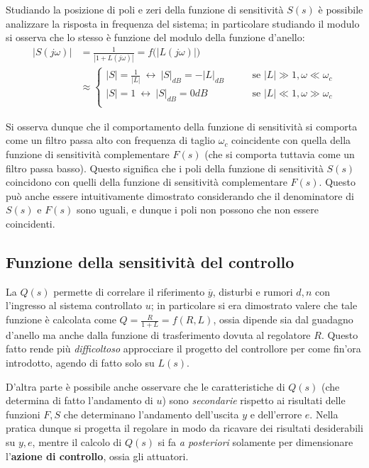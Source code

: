 		Studiando la posizione di poli e zeri della funzione di sensitività $S(s)$ è possibile analizzare la risposta in frequenza del sistema; in particolare studiando il modulo  si osserva che lo stesso è funzione del modulo della funzione d'anello:
		\begin{align*}
			|S(j\omega)| & = \frac 1 {|1 + L(j\omega)|} = f\big(|L(j\omega)|\big) \\
			& \approx \begin{cases}
				|S| = \frac 1 {|L|} \ \leftrightarrow \ |S|_{dB} = - |L|_{dB} \qquad & \textrm{se } |L|\gg 1, \omega \ll \omega_c \\
				|S| = 1 \ \leftrightarrow \ |S|_{dB} = 0dB \qquad & \textrm{se } |L|\ll 1, \omega \gg \omega_c \\
			\end{cases}
		\end{align*}
		
		Si osserva dunque che il comportamento della funzione di sensitività si comporta come un filtro passa alto con frequenza di taglio $\omega_c$ coincidente con quella della funzione di sensitività complementare $F(s)$ (che si comporta tuttavia come un filtro passa basso). Questo significa che i poli della funzione di sensitività $S(s)$ coincidono con quelli della funzione di sensitività complementare $F(s)$. Questo può anche essere intuitivamente dimostrato considerando che il denominatore di $S(s)$ e $F(s)$ sono uguali, e dunque i poli non possono che non essere coincidenti.
		
	\subsection{Funzione della sensitività del controllo}
		La  $Q(s)$ permette di correlare il riferimento $\overline y$, disturbi e rumori $d,n$ con l'ingresso al sistema controllato $u$; in particolare si era dimostrato valere che tale funzione è calcolata come $Q = \frac R {1+L} = f(R,L)$, ossia dipende sia dal guadagno d'anello ma anche dalla funzione di trasferimento dovuta al regolatore $R$. Questo fatto rende più \textit{difficoltoso} approcciare il progetto del controllore per come fin'ora introdotto, agendo di fatto solo su $L(s)$.
		
		D'altra parte è possibile anche osservare che le caratteristiche di $Q(s)$ (che determina di fatto l'andamento di $u$) sono \textit{secondarie} rispetto ai risultati delle funzioni $F,S$ che determinano l'andamento dell'uscita $y$ e dell'errore $e$. Nella pratica dunque si progetta il regolare in modo da ricavare dei risultati desiderabili su $y,e$, mentre il calcolo di $Q(s)$ si fa \textit{a posteriori} solamente per dimensionare l'\textbf{azione di controllo}, ossia gli attuatori.
		
